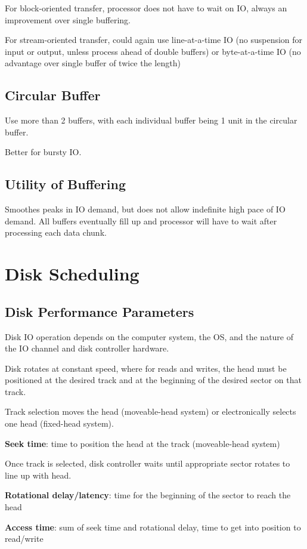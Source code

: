 \documentclass[11pt]{article}
\begin{document}
For block-oriented transfer, processor does not have to wait on IO, always an improvement over
single buffering.

For stream-oriented transfer, could again use line-at-a-time IO (no suspension for input or output,
unless process ahead of double buffers) or byte-at-a-time IO (no advantage over single buffer of
twice the length)
\subsection{Circular Buffer}
\label{sec:orga244f2f}
Use more than 2 buffers, with each individual buffer being 1 unit in the circular buffer.

Better for bursty IO.
\subsection{Utility of Buffering}
\label{sec:orgce30cdb}
Smoothes peaks in IO demand, but does not allow indefinite high pace of IO demand.
All buffers eventually fill up and processor will have to wait after processing each
data chunk.
\section{Disk Scheduling}
\label{sec:orga2e9f3b}
\subsection{Disk Performance Parameters}
\label{sec:org359d0d7}
Disk IO operation depends on the computer system, the OS, and the nature of the IO channel and disk
controller hardware.

Disk rotates at constant speed, where for reads and writes, the head must be positioned at the
desired track and at the beginning of the desired sector on that track.

Track selection moves the head (moveable-head system) or electronically selects one head (fixed-head
system).

\textbf{Seek time}: time to position the head at the track (moveable-head system)

Once track is selected, disk controller waits until appropriate sector rotates to line up with head.

\textbf{Rotational delay/latency}: time for the beginning of the sector to reach the head

\textbf{Access time}: sum of seek time and rotational delay, time to get into position to read/write
\end{document}
